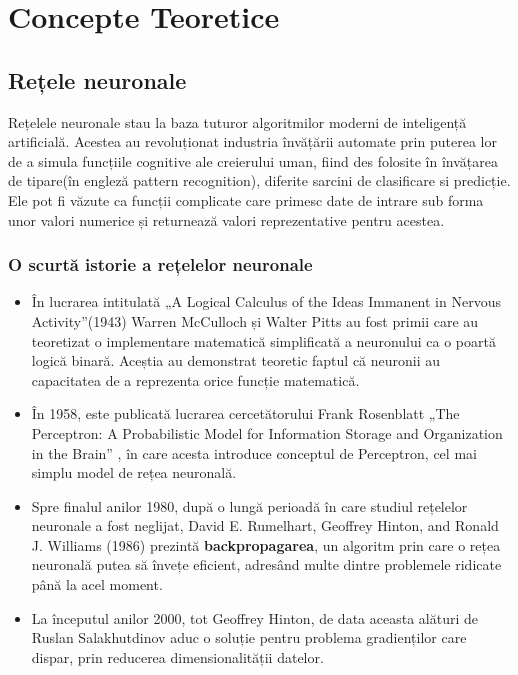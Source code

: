 \chapter{Concepte Teoretice}

\section{Rețele neuronale}
\label{ANN}

Rețelele neuronale stau la baza tuturor algoritmilor moderni de inteligență artificială. Acestea au revoluționat industria învățării automate prin puterea lor de a simula funcțiile cognitive ale creierului uman, fiind des folosite în învățarea de tipare(în engleză pattern recognition), diferite sarcini de clasificare si predicție. Ele pot fi văzute ca funcții complicate care primesc date de intrare sub forma unor valori numerice și returnează valori reprezentative pentru acestea. 

\subsection{O scurtă istorie a rețelelor neuronale}

\begin{itemize}
    \item În lucrarea intitulată „A Logical Calculus of the Ideas Immanent in Nervous Activity”(1943) \cite{mcculloch1943logical} Warren McCulloch și Walter Pitts au fost primii care au teoretizat o implementare matematică simplificată a neuronului ca o poartă logică binară. Aceștia au demonstrat teoretic faptul că neuronii au capacitatea de a reprezenta orice funcție matematică.

    \item În 1958, este publicată lucrarea cercetătorului Frank Rosenblatt „The Perceptron: A Probabilistic Model for Information Storage and Organization in the Brain” \cite{rosenblatt1958perceptron}, în care acesta introduce conceptul de Perceptron, cel mai simplu model de rețea neuronală. 

    \newpage
    
    \item Spre finalul anilor 1980, după o lungă perioadă în care studiul rețelelor neuronale a fost neglijat, David E. Rumelhart, Geoffrey Hinton, and Ronald J. Williams (1986) \cite{rumelhart1986learning} prezintă \textbf{backpropagarea}, un algoritm prin care o rețea neuronală putea să învețe eficient, adresând multe dintre problemele ridicate până la acel moment. 

    \item La începutul anilor 2000, tot Geoffrey Hinton, de data aceasta alături de Ruslan Salakhutdinov \cite{hinton2006reducing} aduc o soluție pentru problema gradienților care dispar, prin reducerea dimensionalității datelor.
\end{itemize}

